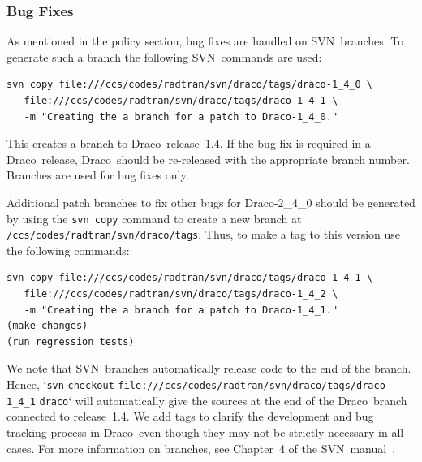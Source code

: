 \documentclass[note]{newmemo}
\newcommand{\draco}{{\normalfont\small\sffamily Draco}}
\newcommand{\cvs}{\textsf{CVS}}
\newcommand{\svn}{\textsf{SVN}}
\begin{document}

\subsubsection{Bug Fixes}

As mentioned in the policy section, bug fixes are handled on
\svn\ branches.  To generate such a branch the following
\svn\ commands are used:
\begin{lstlisting}[basicstyle=\footnotesize, xleftmargin=1.0in, 
  xrightmargin=1.0in]
svn copy file:///ccs/codes/radtran/svn/draco/tags/draco-1_4_0 \
   file:///ccs/codes/radtran/svn/draco/tags/draco-1_4_1 \
   -m "Creating the a branch for a patch to Draco-1_4_0."
\end{lstlisting}
This creates a branch to \draco\ release~1.4.  If the bug fix is
required in a \draco\ release, \draco\ should be re-released with the
appropriate branch number.  Branches are used for bug fixes only.

Additional patch branches to fix other bugs for \draco-2\_4\_0 should
be generated by using the \texttt{svn copy} command to create a new
branch at \texttt{/ccs/codes/radtran/svn/draco/tags}.  Thus, to
make a tag to this version use the following commands:
\begin{lstlisting}[basicstyle=\footnotesize, xleftmargin=1.0in, 
  xrightmargin=1.0in]
svn copy file:///ccs/codes/radtran/svn/draco/tags/draco-1_4_1 \
   file:///ccs/codes/radtran/svn/draco/tags/draco-1_4_2 \
   -m "Creating the a branch for a patch to Draco-1_4_1."
(make changes)
(run regression tests)
\end{lstlisting}
We note that \svn\ branches automatically release code to the end of
the branch.  Hence, `\texttt{svn} \texttt{checkout} \texttt{file:\-///ccs/\-codes/\-radtran\-/svn/draco/tags/draco-1\_4\_1} \texttt{draco}` will
automatically give the sources at the end of the \draco\ branch
connected to release~1.4.  We add tags to clarify the development and
bug tracking process in \draco\ even though they may not be strictly
necessary in all cases.  For more information on branches, see
Chapter~4 of the \svn\ manual~\cite{svn-redbean}.
\end{document}
